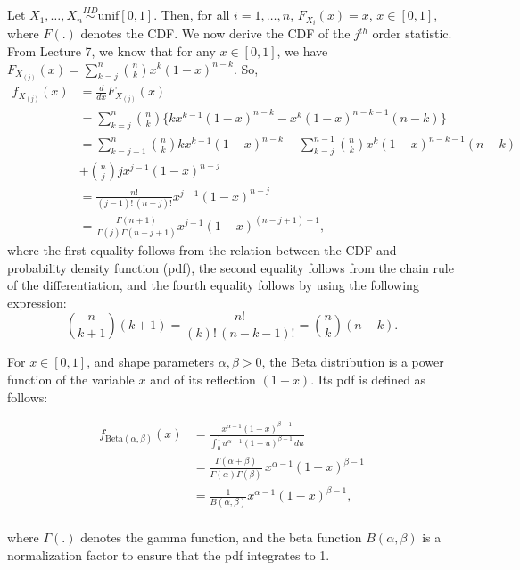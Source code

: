 \documentclass[a4paper,english,12pt]{article}
\begin{document}
\begin{exmp}
	Let $ X_1,\ldots,X_n \stackrel{IID}{\sim} \text{unif}\left[0,1\right] $. Then, for all $ i=1,\ldots,n $, $ F_{X_{i}}(x) = x $, $ x \in \left[0,1\right] $, where $ F(.) $ denotes the CDF. We now derive the CDF of the $ j^{th} $ order statistic. From Lecture 7, we know that for any $ x \in [0,1] $, we have $ F_{X_{\left(j\right)}} (x) = \sum_{k=j}^{n} \binom{n}{k} x^{k} (1-x)^{n-k}$. So,
	\begin{align}
	  	f_{X_{\left(j\right)}} (x)&=\frac{d}{dx} F_{X_{\left(j\right)}} (x)\nonumber\\
	  	&= \sum_{k=j}^{n} \binom{n}{k} \{k x^{k-1} (1-x)^{n-k} - x^{k} (1-x)^{n-k-1} (n-k)\}\nonumber\\
	  	&= \sum_{k=j+1}^{n} \binom{n}{k} k x^{k-1} (1-x)^{n-k}
	  	- \sum_{k=j}^{n-1} \binom{n}{k} x^{k} (1-x)^{n-k-1} (n-k)\nonumber\\
        &+ \binom{n}{j} j x^{j-1} (1-x)^{n-j}\nonumber\\
	  	&= \frac{n!}{ (j-1)! \, (n-j)!  } x^{j-1} (1-x)^{n-j}\nonumber\\
	  	&= \frac{\Gamma(n+1)}{ \Gamma(j) \Gamma(n-j+1)  } x^{j-1} (1-x)^{(n-j+1)-1}, \label{unif_stat}
    \end{align}
    where the first equality follows from the relation between the CDF and probability density function (pdf), the second equality follows from the chain rule of the differentiation, and the fourth equality follows by using the following expression:
    \begin{equation}
      \binom{n}{k+1} (k+1) = \frac{n!}{ (k)! \, (n-k-1)! } = \binom{n}{k} (n-k). \nonumber
    \end{equation}
    
    \begin{defn}
    	For $ x \in [0,1] $, and {shape parameters} $ \alpha, \beta > 0 $, the Beta distribution is a power function of the variable $ x $ and of its reflection $(1-x)$. Its pdf is defined as follows:
    	
    	\begin{align*}
    		f_{\text{Beta}(\alpha, \beta)}(x) & = \frac{x^{\alpha-1}(1-x)^{\beta-1}}{\int_0^1 u^{\alpha-1} (1-u)^{\beta-1}\, du} \\
    		& = \frac{\Gamma(\alpha+\beta)}{\Gamma(\alpha)\Gamma(\beta)}\, x^{\alpha-1}(1-x)^{\beta-1} \\
    		& = \frac{1}{B(\alpha,\beta)} x^{\alpha-1}(1-x)^{\beta-1},
    	\end{align*}
    	\\
    	where $ \Gamma(.) $ denotes the gamma function, and the beta function $B(\alpha,\beta)$ is a normalization factor to ensure that the pdf integrates to 1.
    \end{defn}
    

\end{exmp}
\end{document}

